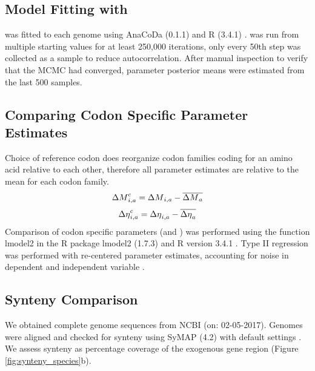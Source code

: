 \subsection{Model Fitting with \ROC}
\ROC was fitted to each genome using AnaCoDa (0.1.1) \citep{landerer2018} and R (3.4.1) \citep{rcore}.
\ROC was run from multiple starting values for at least 250,000 iterations, only every 50th step was collected as a sample to reduce autocorrelation. 
After manual inspection to verify that the MCMC had converged, parameter posterior means were estimated from the last 500 samples.

\subsection{Comparing Codon Specific Parameter Estimates}
Choice of reference codon does reorganize codon families coding for an amino acid relative to each other, therefore all parameter estimates are relative to the mean for each codon family.
\begin{equation}
{\Delta M}_{i,a}^c = {\Delta M}_{i,a} - \overline{{\Delta M}_a}
\end{equation}
\begin{equation}
{\Delta \eta}_{i,a}^c = {\Delta \eta}_{i,a} - \overline{{\Delta \eta}_a}
\end{equation}
Comparison of codon specific parameters (\DM and \DE) was performed using the function lmodel2 in the R package lmodel2 (1.7.3) \citep{lmodel2} and R version 3.4.1 \citep{rcore}.
Type II regression was performed with re-centered parameter estimates, accounting for noise in dependent and independent variable \citep{SokalAndRohlf1981}.


\subsection{Synteny Comparison}
We obtained complete genome sequences from NCBI (on: 02-05-2017).
Genomes were aligned and checked for synteny using SyMAP (4.2) with default settings \citep{soderlund2006, soderlund2011}.
We assess synteny as percentage coverage of the exogenous gene region (Figure \ref{fig:synteny_species}b).

